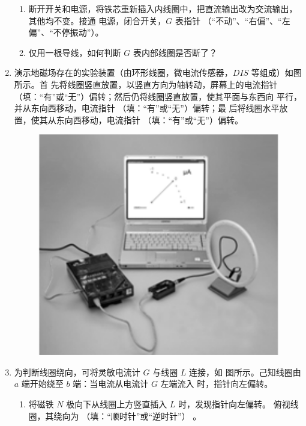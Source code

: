 \begin{enumerate}
\begin{enumerate}
\item 
断开开关和电源，将铁芯重新插入内线圈中，把直流输出改为交流输出，其他均不变。接通
电源，闭合开关，$ G $ 表指针 \underlinegap （“不动”、“右偏”、“左偏”、“不停振动”）。

\item 
仅用一根导线，如何判断 $ G $ 表内部线圈是否断了？

\hfullline 

\end{enumerate}







\item
{}
演示地磁场存在的实验装置（由环形线圈，微电流传感器，$ DIS $ 等组成）如图所示。首
先将线圈竖直放置，以竖直方向为轴转动，屏幕上的电流指针 \underlinegap 
（填：“有”或“无”）偏转；然后仍将线圈竖直放置，使其平面与东西向
平行，并从东向西移动，电流指针
\underlinegap 
（填：“有”或“无”）偏转；最
后将线圈水平放置，使其从东向西移动，电流指针
\underlinegap 
（填：“有”或“无”）偏转。
\begin{figure}[h!]
\centering
\includegraphics[width=0.23\linewidth]{picture/screenshot064}
\end{figure}




\item 
{}
为判断线圈绕向，可将灵敏电流计 $ G $ 与线圈 $ L $ 连接，如
图所示。己知线圈由 $ a $ 端开始绕至 $ b $ 端：当电流从电流计 $ G $ 左端流入
时，指针向左偏转。
\begin{enumerate}
\item
将磁铁 $ N $ 极向下从线圈上方竖直插入 $ L $ 时，发现指针向左偏转。
俯视线圈，其绕向为 \underlinegap （填：“顺时针”或“逆时针”）
。


\end{enumerate}
\end{enumerate}
